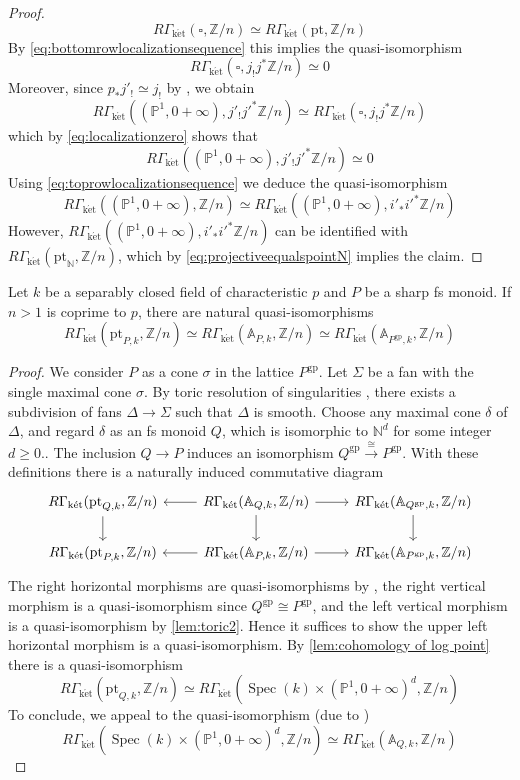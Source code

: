 \documentclass[10pt]{amsart}
\newcommand{\A}{\mathbb{A}}
\newcommand{\N}{\mathbb{N}}
\renewcommand{\P}{\mathbb{P}}
\newcommand{\Z}{\mathbb{Z}}
\newcommand{\gp}{\mathrm{gp}}
\DeclareMathOperator{\Spec}{Spec}
\newcommand{\ket}{\mathrm{k\acute{e}t}}
\newcommand{\pt}{\mathrm{pt}}
\begin{document}
\begin{proof}
$$R\Gamma_{\ket}(\square,\Z/n) \simeq R\Gamma_{\ket}(\pt,\Z/n)$$
By \eqref{eq:bottomrowlocalizationsequence} this implies the quasi-isomorphism
\begin{equation}\label{eq:localizationzero}
R\Gamma_{\ket}(\square,j_!j^*\Z/n) \simeq 0
\end{equation}
Moreover, since $p_*j'_! \simeq j_!$ by \cite[§5.4]{MR1457738}, we obtain 
$$R\Gamma_{\ket}((\P^1,0+\infty),j'_!j'^*\Z/n)\simeq 
R\Gamma_{\ket}(\square,j_!j^*\Z/n)$$
which by \eqref{eq:localizationzero} shows that
$$R\Gamma_{\ket}((\P^1,0+\infty),j'_!j'^*\Z/n) \simeq 0$$
Using \eqref{eq:toprowlocalizationsequence} we deduce the quasi-isomorphism
\begin{equation}\label{eq:projectiveequalspointN}
R\Gamma_{\ket}((\P^1,0+\infty),\Z/n) \simeq R\Gamma_{\ket}((\P^1,0+\infty),i'_*i'^*\Z/n)
\end{equation}
However, $R\Gamma_{\ket}((\P^1,0+\infty),i'_*i'^*\Z/n)$ can be identified with $R\Gamma_{\ket}(\pt_\N,\Z/n)$, which by \eqref{eq:projectiveequalspointN} implies the claim.
\end{proof}

\begin{lemma}
\label{lem:cohomology}
Let $k$ be a separably closed field of characteristic $p$ and $P$ be a sharp fs monoid.
If $n>1$ is coprime to $p$,
there are natural quasi-isomorphisms
\[
R\Gamma_\ket(\pt_{P,k},\Z/n)
\simeq
R\Gamma_\ket(\A_{P,k},\Z/n)
\simeq
R\Gamma_\ket(\A_{P^\gp,k},\Z/n)
\]
\end{lemma}
\begin{proof}
We consider $P$ as a cone $\sigma$ in the lattice $P^\gp$.
Let $\Sigma$ be a fan with the single maximal cone $\sigma$.
By toric resolution of singularities \cite[Theorem 11.1.9]{toric},
there exists a subdivision of fans $\Delta\to \Sigma$ such that $\Delta$ is smooth.
Choose any maximal cone $\delta$ of $\Delta$,
and regard $\delta$ as an fs monoid $Q$,
which is isomorphic to $\N^d$ for some integer $d\geq 0$..
The inclusion $Q\to P$ induces an isomorphism $Q^\gp\xrightarrow{\cong}P^\gp$.
With these definitions there is a naturally induced commutative diagram
\[
\begin{tikzcd}
R\Gamma_\ket(\pt_{Q,k},\Z/n)\ar[d]\ar[r,leftarrow]&
R\Gamma_\ket(\A_{Q,k},\Z/n)\ar[d]\ar[r]&
R\Gamma_\ket(\A_{Q^\gp,k},\Z/n)\ar[d]
\\
R\Gamma_\ket(\pt_{P,k},\Z/n)\ar[r,leftarrow]&
R\Gamma_\ket(\A_{P,k},\Z/n)\ar[r]&
R\Gamma_\ket(\A_{P^\gp,k},\Z/n)
\end{tikzcd}
\]
The right horizontal morphisms are quasi-isomorphisms by \cite[Theorem 7.4]{MR1922832},
the right vertical morphism is a quasi-isomorphism since $Q^\gp\cong P^\gp$,
and the left vertical morphism is a quasi-isomorphism by \cref{lem:toric2}.
Hence it suffices to show the upper left horizontal morphism is a quasi-isomorphism.
By \cref{lem:cohomology of log point} there is a quasi-isomorphism
\[
R\Gamma_\ket(\pt_{Q,k},\Z/n)
\simeq
R\Gamma_\ket(\Spec(k)\times (\P^1,0+\infty)^d,\Z/n)
\]
To conclude, 
we appeal to the quasi-isomorphism 
(due to \cite[Theorem 7.4]{MR1922832})
\[
R\Gamma_\ket(\Spec(k)\times (\P^1,0+\infty)^d,\Z/n)
\simeq
R\Gamma_\ket(\A_{Q,k},\Z/n)
\]
\end{proof}
\end{document}
